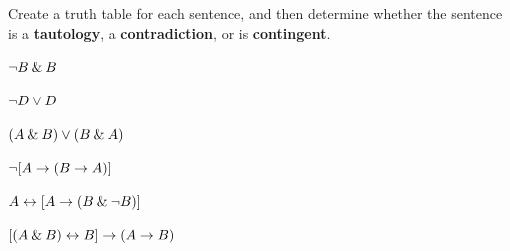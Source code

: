 \problempart Create a truth table for each sentence, and then determine whether the sentence is a \textbf{tautology}, a \textbf{contradiction}, or is \textbf{contingent}.

\begin{earg}
\item ${\neg} B \mathbin{\&} B$ \vspace{.5ex}%
\item ${\neg} D \vee D$ \vspace{.5ex}%
\item $(A\mathbin{\&} B) \vee (B\mathbin{\&} A)$\vspace{.5ex} %
\item ${\neg}[A \rightarrow (B \rightarrow A)]$\vspace{.5ex} %
\item $A \leftrightarrow [A \rightarrow (B \mathbin{\&} {\neg} B)]$ \vspace{.5ex}%
\item $[(A \mathbin{\&} B) \leftrightarrow B] \rightarrow (A \rightarrow B)$ \vspace{.5ex}%
\end{earg}


